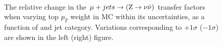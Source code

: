 \begin{figure}[!h]
  \centering
   ~~
  \\

  \caption{\label{fig:tfSyst_topPt_muToZinv} The relative change in
  the $\mu + jets \rightarrow ({\text Z} \rightarrow \nu\bar{\nu})$ transfer
  factors when varying top $p_{T}$ weight in MC within its uncertainties, as a function of \scalht and jet category. 
  Variations corresponding to $+1\sigma$ ($-1\sigma$) are shown in the left (right) figure. 
  }
\end{figure}
